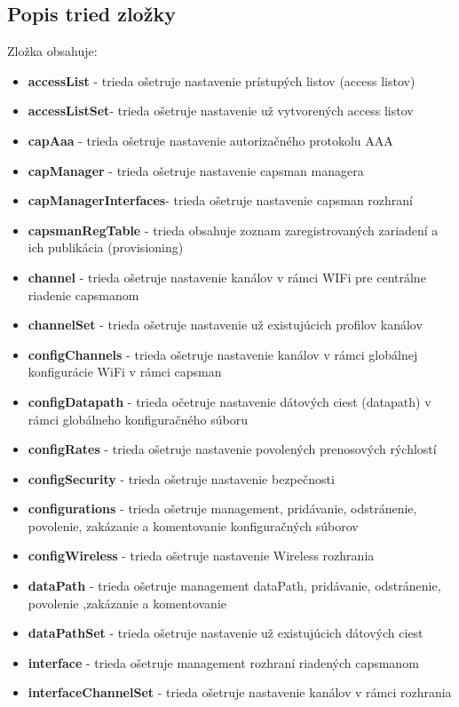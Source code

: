 \subsection{Popis tried zložky}
Zložka obsahuje:\begin{itemize}
\item \textbf{accessList} - trieda ošetruje nastavenie prístupých listov (access listov)
\item \textbf{accessListSet}- trieda ošetruje nastavenie už vytvorených access listov
\item \textbf{capAaa} - trieda ošetruje nastavenie autorizačného protokolu  AAA
\item \textbf{capManager} - trieda ošetruje nastavenie capsman managera
\item \textbf{capManagerInterfaces}- trieda ošetruje nastavenie capsman rozhraní
\item \textbf{capsmanRegTable} - trieda obsahuje zoznam zaregistrovaných zariadení  a ich publikácia (provisioning)
\item \textbf{channel} - trieda ošetruje nastavenie kanálov v rámci WIFi pre centrálne riadenie capsmanom
\item \textbf{channelSet} - trieda ošetruje nastavenie už existujúcich profilov kanálov 
\item \textbf{configChannels} - trieda ošetruje nastavenie kanálov v rámci globálnej konfigurácie WiFi v rámci  capsman
\item \textbf{configDatapath} - trieda očetruje nastavenie dátových ciest (datapath) v rámci globálneho konfiguračného súboru 
\item \textbf{configRates} - trieda ošetruje nastavenie povolených prenosových rýchlostí 
\item \textbf{configSecurity} - trieda ošetruje nastavenie bezpečnosti
\item \textbf{configurations} - trieda ošetruje management, pridávanie, odstránenie, povolenie, zakázanie a komentovanie konfiguračných súborov
\item \textbf{configWireless} - trieda ošetruje nastavenie Wireless rozhrania
\item \textbf{dataPath} - trieda ošetruje management dataPath, pridávanie, odstránenie, povolenie ,zakázanie a komentovanie
\item \textbf{dataPathSet} - trieda ošetruje nastavenie už existujúcich dátových ciest
\item \textbf{interface} - trieda ošetruje management rozhraní riadených capsmanom
\item \textbf{interfaceChannelSet} - trieda ošetruje nastavenie kanálov v rámci rozhrania

\end{itemize}
